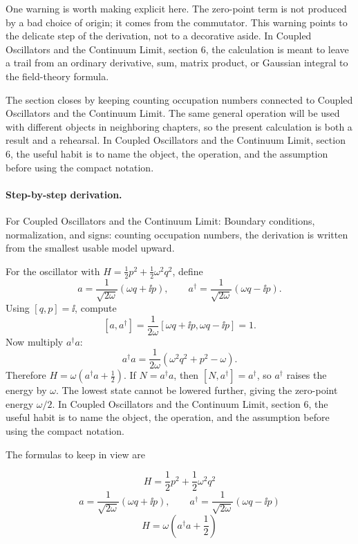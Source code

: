 One warning is worth making explicit here.  The zero-point term is not produced by a bad choice of origin; it comes from the commutator.  This warning points to the delicate step of the derivation, not to a decorative aside.  In Coupled Oscillators and the Continuum Limit, section 6, the calculation is meant to leave a trail from an ordinary derivative, sum, matrix product, or Gaussian integral to the field-theory formula.

The section closes by keeping counting occupation numbers connected to Coupled Oscillators and the Continuum Limit.  The same general operation will be used with different objects in neighboring chapters, so the present calculation is both a result and a rehearsal.  In Coupled Oscillators and the Continuum Limit, section 6, the useful habit is to name the object, the operation, and the assumption before using the compact notation.



\paragraph{Step-by-step derivation.}

For Coupled Oscillators and the Continuum Limit: Boundary conditions, normalization, and signs: counting occupation numbers, the derivation is written from the smallest usable model upward.

For the oscillator with \(H=\frac12p^2+\frac12\omega^2q^2\), define
\[
  a=\frac{1}{\sqrt{2\omega}}(\omega q+\ii p),\qquad
  a^\dagger=\frac{1}{\sqrt{2\omega}}(\omega q-\ii p).
\]
Using \([q,p]=\ii\), compute
\[
  [a,a^\dagger]
  =
  \frac{1}{2\omega}[\omega q+\ii p,\omega q-\ii p]=1.
\]
Now multiply \(a^\dagger a\):
\[
  a^\dagger a=\frac{1}{2\omega}(\omega^2q^2+p^2-\omega).
\]
Therefore \(H=\omega(a^\dagger a+\frac12)\).  If \(N=a^\dagger a\), then \([N,a^\dagger]=a^\dagger\), so \(a^\dagger\) raises the energy by \(\omega\).  The lowest state cannot be lowered further, giving the zero-point energy \(\omega/2\).  In Coupled Oscillators and the Continuum Limit, section 6, the useful habit is to name the object, the operation, and the assumption before using the compact notation.

The formulas to keep in view are

\[
  H=\frac12p^2+\frac12\omega^2q^2
\]
\[
  a=\frac{1}{\sqrt{2\omega}}(\omega q+\ii p),\qquad a^\dagger=\frac{1}{\sqrt{2\omega}}(\omega q-\ii p)
\]
\[
  H=\omega\left(a^\dagger a+\frac12\right)
\]

